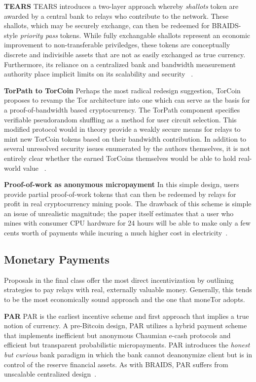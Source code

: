 \textbf{TEARS} TEARS introduces a two-layer approach whereby \emph{shallots}
token are awarded by a central bank to relays who contribute to the
network. These shallots, which may be securely exchange, can then be redeemed
for BRAIDS-style \emph{priority pass} tokens. While fully exchangable shallots
represent an economic improvement to non-transferable priviledges, these tokens
are conceptually discrete and indivisible assets that are not as easily
exchanged as true currency. Furthermore, its reliance on a centralized bank and
bandwidth measurement authority place implicit limits on its scalability and
security ~\cite{jansen2010recruiting}.

\textbf{TorPath to TorCoin} Perhaps the most radical redesign suggestion,
TorCoin proposes to revamp the Tor architecture into one which can serve as the
basis for a proof-of-bandwidth based cryptocurrency. The TorPath component
specifies verifiable pseudorandom shuffling as a method for user circuit
selection. This modified protocol would in theory provide a weakly secure means
for relays to mint new TorCoin tokens based on their bandwidth contribution. In
addition to several unresolved security issues enumerated by the authors
themselves, it is not entirely clear whether the earned TorCoins themselves
would be able to hold real-world value ~\cite{ghosh2014torpath}.

\textbf{Proof-of-work as anonymous micropayment} In this simple design,
users provide partial proof-of-work tokens that can then be redeemed by relays
for profit in real cryptocurrency mining pools. The drawback of this scheme is
simple an issue of unrealistic magnitude; the paper itself estimates that a user
who mines with consumer CPU hardware for 24 hours will be able to make only a
few cents worth of payments while incuring a much higher cost in
electricity~\cite{biryukov2015proof}.

\subsection{Monetary Payments}

Proposals in the final class offer the most direct incentivization by outlining
strategies to pay relays with real, externally valuable money. Generally, this
tends to be the most economically sound approach and the one that moneTor
adopts.

\textbf{PAR} PAR is the earliest incentive scheme and first approach that
implies a true notion of currency. A pre-Bitcoin design, PAR utilizes a hybrid
payment scheme that implements inefficient but anonymous Chaumian e-cash
protocols and efficient but transparent probabilistic micropayments. PAR
introduces the \emph{honest but curious} bank paradigm in which the bank cannot
deanonymize client but is in control of the reserve financial assets. As with
BRAIDS, PAR suffers from unscalable centralized design~\cite{androulaki2008payment}.

